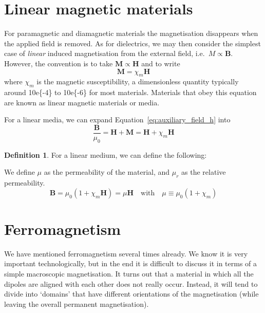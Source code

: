 \documentclass[12pt,chapterprefix=false,dvipsnames]{scrbook}
\theoremstyle{dotless}
\theoremstyle{definition}
\newtheorem{protodefinition}{Definition}[section]
\newenvironment{definition}
{\colorlet{shadecolor}{black!15}\begin{shaded}\begin{protodefinition}}
			{\end{protodefinition}\end{shaded}}
\begin{document}
\section{Linear magnetic materials}%
\label{sec:linear_magnetic_materials}

For paramagnetic and diamagnetic materials the magnetisation
disappears when the applied field is removed. As for
dielectrics, we may then consider the simplest case of
\textit{linear} induced magnetisation from the external
field, i.e.\ $M\propto\bm{B}$. However, the convention is
to take $\bm{M}\propto\bm{H}$ and to write
\begin{equation}
	\bm{M} =
	\chi_{m}\bm{H}
\end{equation}
where $\chi_m$ is the magnetic susceptibility, a
dimensionless quantity typically around \SI{10e{-4}}{}
to \SI{10e{-6}}{} for most materials. Materials that
obey this equation are known as linear magnetic materials or
media.

For a linear media, we can expand
Equation~\ref{eq:auxiliary_field_h} into
\begin{equation}
	\frac{\bm{B}}{\mu_{0}}
	=
	\bm{H} + \bm{M}
	=
	\bm{H} + \chi_m\bm{H}
\end{equation}

\begin{definition}
	For a linear medium, we can define the following:

	We define $\mu$ as the permeability of the
	material, and $\mu_r$ as the relative
	permeability.
	\begin{equation}
		\bm{B}
		=
		\mu_{0}\left(1+\chi_m\bm{H}\right)
		=
		\mu\bm{H}
		\hspace{1em}\mathrm{with}\hspace{1em}
		\mu\equiv\mu_{0}\left(1 + \chi_m\right)
	\end{equation}
\end{definition}

\section{Ferromagnetism}%
\label{sec:ferromagnetism}

We have mentioned ferromagnetism several times already. We know
it is very important technologically, but in the end it is
difficult to discuss it in terms of a simple macroscopic
magnetisation. It turns out that a material in which all the
dipoles are aligned with each other does not really occur.
Instead, it will tend to divide into `domains' that have
different orientations of the magnetisation (while leaving the
overall permanent magnetisation).
\end{document}
